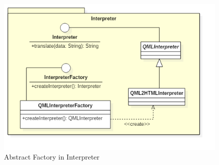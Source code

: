 \begin{itemize}
	\begin{figure}[h!]
	\begin{center}
		\includegraphics[scale=0.5]{../images/interpreterClass.png}
		\caption{Abstract Factory in Interpreter}
	\end{center}
	\end{figure}
	\end{itemize}
	
	\iffalse %
